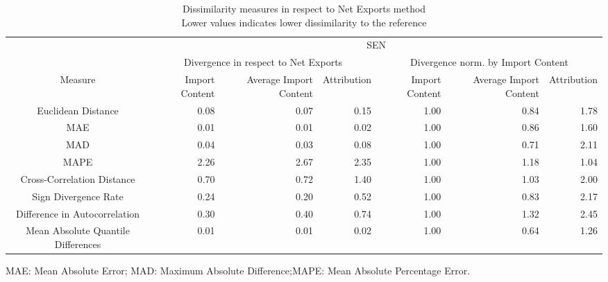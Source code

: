 \begin{table}[t]
\caption*{
{\large Dissimilarity measures in respect to Net Exports method} \\ 
{\small Lower values indicates lower dissimilarity to the reference}
} 
\fontsize{15.0pt}{18.0pt}\selectfont
\begin{tabular*}{\linewidth}{@{\extracolsep{\fill}}crrrrrr}
\toprule
 & \multicolumn{6}{c}{SEN} \\ 
\cmidrule(lr){2-7}
 & \multicolumn{3}{c}{Divergence in respect to Net Exports} & \multicolumn{3}{c}{Divergence norm. by Import Content} \\ 
\cmidrule(lr){2-4} \cmidrule(lr){5-7}
Measure & Import Content & Average Import Content & Attribution & Import Content & Average Import Content & Attribution \\ 
\midrule\addlinespace[2.5pt]
Euclidean Distance & 0.08 & 0.07 & 0.15 & 1.00 & 0.84 & 1.78 \\ 
MAE & 0.01 & 0.01 & 0.02 & 1.00 & 0.86 & 1.60 \\ 
MAD & 0.04 & 0.03 & 0.08 & 1.00 & 0.71 & 2.11 \\ 
MAPE & 2.26 & 2.67 & 2.35 & 1.00 & 1.18 & 1.04 \\ 
Cross-Correlation Distance & 0.70 & 0.72 & 1.40 & 1.00 & 1.03 & 2.00 \\ 
Sign Divergence Rate & 0.24 & 0.20 & 0.52 & 1.00 & 0.83 & 2.17 \\ 
Difference in Autocorrelation & 0.30 & 0.40 & 0.74 & 1.00 & 1.32 & 2.45 \\ 
Mean Absolute Quantile Differences & 0.01 & 0.01 & 0.02 & 1.00 & 0.64 & 1.26 \\ 
\bottomrule
\end{tabular*}
\begin{minipage}{\linewidth}
MAE: Mean Absolute Error; MAD: Maximum Absolute Difference;MAPE: Mean Absolute Percentage Error.\\
\end{minipage}
\end{table}

